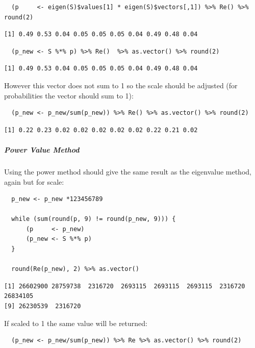 \documentclass[11pt]{article}
\begin{document}
\begin{verbatim}
  (p     <- eigen(S)$values[1] * eigen(S)$vectors[,1]) %>% Re() %>%  round(2)
\end{verbatim}

\begin{verbatim}
[1] 0.49 0.53 0.04 0.05 0.05 0.05 0.04 0.49 0.48 0.04
\end{verbatim}


\begin{verbatim}
  (p_new <- S %*% p) %>% Re()  %>% as.vector() %>% round(2)
\end{verbatim}

\begin{verbatim}
[1] 0.49 0.53 0.04 0.05 0.05 0.05 0.04 0.49 0.48 0.04
\end{verbatim}


However this vector does not sum to 1 so the scale should be adjusted
(for probabilities the vector should sum to 1):

\begin{verbatim}
  (p_new <- p_new/sum(p_new)) %>% Re() %>% as.vector() %>% round(2)
\end{verbatim}

\begin{verbatim}
[1] 0.22 0.23 0.02 0.02 0.02 0.02 0.02 0.22 0.21 0.02
\end{verbatim}

\subparagraph{Power Value Method}
\label{power-value-method}
Using the power method should give the same result as the eigenvalue method, again but for scale:

\begin{verbatim}
  p_new <- p_new *123456789

  while (sum(round(p, 9) != round(p_new, 9))) {
      (p     <- p_new)
      (p_new <- S %*% p)
  }

  round(Re(p_new), 2) %>% as.vector()
\end{verbatim}

\begin{verbatim}
[1] 26602900 28759738  2316720  2693115  2693115  2693115  2316720 26834105
[9] 26230539  2316720
\end{verbatim}


If scaled to 1 the
same value will be returned:

\begin{verbatim}
  (p_new <- p_new/sum(p_new)) %>% Re %>% as.vector() %>% round(2)
\end{verbatim}
\end{document}
